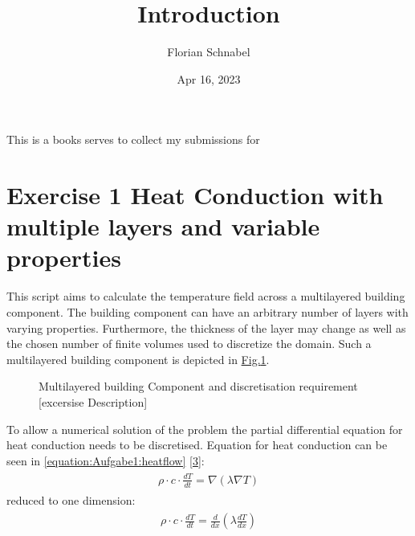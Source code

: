 \documentclass[letterpaper,10pt,english]{jupyterBook}
\title{Introduction}
\date{Apr 16, 2023}
\author{Florian Schnabel}
\let\sphinxpxdimen\pdfpxdimen\else\newdimen\sphinxpxdimen
\begin{document}
\pagestyle{empty}
\sphinxmaketitle
\pagestyle{plain}
\sphinxtableofcontents
\pagestyle{normal}
\label{\detokenize{intro::doc}}


\sphinxAtStartPar
This is a books serves to collect my submissions for 

\sphinxstepscope




\section{Exercise 1 \sphinxhyphen{} Heat Conduction with multiple layers and variable properties}
\label{\detokenize{Aufgabe1:exercise-1-heat-conduction-with-multiple-layers-and-variable-properties}}\label{\detokenize{Aufgabe1::doc}}
\sphinxAtStartPar
This script aims to calculate the temperature field across a multilayered building component. The building component can have an arbitrary number of layers with varying properties. Furthermore,
the thickness of the layer may change as well as the chosen number of finite volumes used to discretize
the domain. Such a multilayered building component is depicted in \hyperref[\detokenize{Aufgabe1:fig-multilaycomp}]{Fig.\@ \ref{\detokenize{Aufgabe1:fig-multilaycomp}}}.

\begin{figure}[htbp]
\centering
\capstart

\noindent\sphinxincludegraphics[width=350\sphinxpxdimen]{{BuildingComponent}.png}
\caption{Multilayered building Component and discretisation requirement {[}excersise Description{]}}\label{\detokenize{Aufgabe1:fig-multilaycomp}}\end{figure}

\sphinxAtStartPar
To allow a numerical solution of the problem the partial differential equation for heat conduction needs to be discretised. Equation for heat conduction can be seen in \eqref{equation:Aufgabe1:heatflow} {[}\hyperlink{cite.Aufgabe1:id6}{3}{]}:
\begin{equation}\label{equation:Aufgabe1:heatflow}
\begin{split}\begin{align}
\rho \cdot c \cdot \frac{dT}{dt} = \nabla (\lambda \nabla T) 
\end{align}\end{split}
\end{equation}
\sphinxAtStartPar
reduced to one dimension:
\begin{equation}\label{equation:Aufgabe1:heatflow2}
\begin{split}\begin{align}
\rho \cdot c \cdot \frac{dT}{dt} =  \frac{d}{dx}(\lambda \frac{dT}{dx}) 
\end{align}\end{split}
\end{equation}
\end{document}
